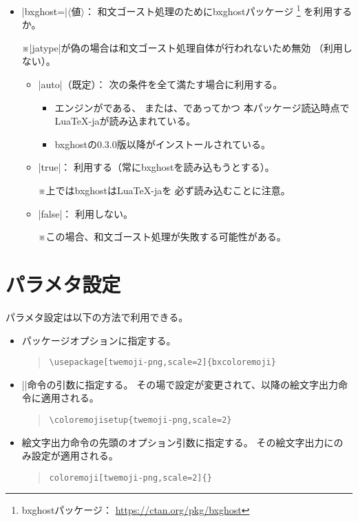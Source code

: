 \documentclass[a4paper]{ltjsarticle}
\renewcommand{\headfont}{\romanseries{sbc}\sffamily}
\newcommand{\CE}[1]{\coloremoji{#1}}
\newcommand{\Pkg}[1]{\textsf{#1}}
\newcommand{\Meta}[1]{$\langle$\mbox{}#1\mbox{}$\rangle$}
\newcommand{\Note}{\par\noindent ※}
\newcommand{\Means}{：\quad}
\newcommand{\／}{\mbox{}／\mbox{}}
\newcommand{\EG}{\eghostguarded}
\newcommand{\cs}[1]{\symbol{`\\}#1}
\providecommand{\Strong}[1]{{\headfont#1}}
\begin{document}
\begin{itemize}
\item |bxghost=|\Meta{値}\Means
  和文ゴースト処理のために\Pkg{bxghost}パッケージ
  \footnote{\Pkg{bxghost}パッケージ\Means
    \url{https://ctan.org/pkg/bxghost}}%
  を利用するか。
  \Note |jatype|が偽の場合は和文ゴースト処理自体が行われないため無効
  （利用しない）。
  \begin{itemize}
  \item |auto|（既定）\Means
    次の条件を\Strong{全て}満たす場合に利用する。
    \begin{itemize}
    \item エンジンが\EG{(u)\pLaTeX}である、
      または、{\LuaLaTeX}であってかつ
      本パッケージ\Strong{読込時点}で\Pkg{LuaTeX-ja}が読み込まれている。
    \item \Pkg{bxghost}の0.3.0版以降がインストールされている。
    \end{itemize}
  \item |true|\Means
    利用する（常に\Pkg{bxghost}を読み込もうとする）。
    \Note {\LuaLaTeX}上では\Pkg{bxghost}は\Pkg{LuaTeX-ja}を
    必ず読み込むことに注意。
  \item |false|\Means
    利用しない。
    \Note この場合、和文ゴースト処理が失敗する可能性がある。
  \end{itemize}
\end{itemize}


\section{パラメタ設定}
\label{sec:Parameters}

パラメタ設定は以下の方法で利用できる。

\begin{itemize}
\item パッケージオプションに指定する。
\begin{quote}\small\begin{verbatim}
\usepackage[twemoji-png,scale=2]{bxcoloremoji}
\end{verbatim}\end{quote}
\item
  ||命令の引数に指定する。
  その場で設定が変更されて、以降の絵文字出力命令に適用される。
\begin{quote}\small\begin{verbatim}
\coloremojisetup{twemoji-png,scale=2}
\end{verbatim}\end{quote}
\item
  絵文字出力命令の先頭のオプション引数に指定する。
  その絵文字出力にのみ設定が適用される。
\begin{quote}\small\begin{alltt}
\cs{coloremoji}[twemoji-png,scale=2]\{\CE{☃}\}
\end{alltt}\end{quote}
\end{itemize}
\end{document}
